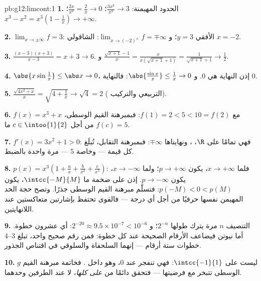 \begin{solution}{pb:g12:limcont:1}
\textbf{1.} الحدود المهيمنة: $\frac{3x^2}{x^2} \to 3$؛
$\frac{2x}{x^2} = \frac2x \to 0$؛
$x^3 - x^2 = x^3\left(1 - \frac1x\right) \to +\infty$.

\textbf{2.} $\lim_{x \to \pm\infty} f = 3$: 
الأفقي $y = 3$؛ و $\lim_{x \to (-2)^\pm} f = \mp\infty$:
 الشاقولي $x = -2$.

\textbf{3.} $\frac{(x-3)(x+3)}{x - 3} = x + 3 \to 6$. و
$\frac{\sqrt{x+1} - 1}{x} = \frac{x}{x(\sqrt{x+1} + 1)} =
\frac{1}{\sqrt{x+1} + 1} \to \frac12$.

\textbf{4.} $\abs{x \sin\frac1x} \leq \abs x \to 0$، إذن
النهاية هي $0$. و
$\abs{\frac{\sin x}{x}} \leq \frac1x \to 0$: فالنهاية $0$.

\textbf{5.} $\frac{\sqrt{4x^2 + x}}{x} =
\sqrt{4 + \frac1x} \to \sqrt4 = 2$ ( 
التربيعي والتركيب).

\textbf{6.} $f(x) = x^3 + x$  مع
$f(1) = 2 < 5 < 10 = f(2)$: فبمبرهنة القيم الوسطى، $f(c) = 5$ من أجل
$c \in \intoo{1}{2}$ ما.

\textbf{7.} $f'(x) = 3x^2 + 1 > 0$: فهي  تمامًا على
$\R$، ، ونهايتاها $\mp\infty$: فبمبرهنة
التقابل، تُبلَغ كل قيمة --- وخاصة $5$ ---
مرة واحدة بالضبط.

\textbf{8.} $p(x) = x^3\left(1 + \frac ax + \frac{b}{x^2} +
\frac{c}{x^3}\right)$: فلما $x \to +\infty$، يكون $p \to +\infty$؛ ولما
$x \to -\infty$، يكون $p \to -\infty$. إذن على  ضخمة ما
$\intcc{-M}{M}$، يكون $p(-M) < 0 < p(M)$: فتسلّم مبرهنة القيم الوسطى جذرًا.
وتصح حجة الحد المهيمن نفسها حرفيًا من أجل أي درجة
 --- فالقوى  تحتفظ بإشارتين متعاكستين عند
اللانهايتين.

\textbf{9.} التنصيف $n$ مرة يترك  طولها
$2^{-n}$؛ و $2^{-20} \approx 9.5 \times 10^{-7} < 10^{-6}$:
أي عشرون خطوة. أما نيوتن فيضاعف الأرقام الصحيحة عند كل خطوة: فمن
رقم صحيح واحد، تبلغ $3$--$4$ خطوات ستة أرقام --- إنهما
السلحفاة والسلوقي في اقتناص الجذور.

\textbf{10.} $g$ ليست  على $\intcc{-1}{1}$: فهي
تنفجر عند $0$، وهو داخل . فخاتمة مبرهنة القيم
الوسطى تتبخر مع فرضيتها --- فتحقق دائمًا من
 \emph{على  كلها}، لا عند الطرفين
وحدهما.


\end{solution}
